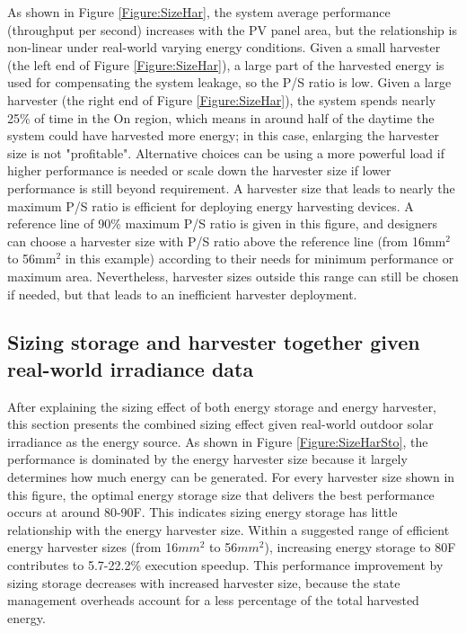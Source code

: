 As shown in Figure \ref{Figure:SizeHar}, the system average performance (throughput per second) increases with the PV panel area, but the relationship is non-linear under real-world varying energy conditions. Given a small harvester (the left end of Figure \ref{Figure:SizeHar}), a large part of the harvested energy is used for compensating the system leakage, so the P/S ratio is low. Given a large harvester (the right end of Figure \ref{Figure:SizeHar}), the system spends nearly 25\% of time in the On region, which means in around half of the daytime the system could have harvested more energy; in this case, enlarging the harvester size is not "profitable". Alternative choices can be using a more powerful load if higher performance is needed or scale down the harvester size if lower performance is still beyond requirement. A harvester size that leads to nearly the maximum P/S ratio is efficient for deploying energy harvesting devices. A reference line of 90\% maximum P/S ratio is given in this figure, and designers can choose a harvester size with P/S ratio above the reference line (from 16mm$^2$ to 56mm$^2$ in this example) according to their needs for minimum performance or maximum area. Nevertheless, harvester sizes outside this range can still be chosen if needed, but that leads to an inefficient harvester deployment. 

\subsection{Sizing storage and harvester together given real-world irradiance data} \label{Section:4.5}

After explaining the sizing effect of both energy storage and energy harvester, this section presents the combined sizing effect given real-world outdoor solar irradiance as the energy source. As shown in Figure \ref{Figure:SizeHarSto}, the performance is dominated by the energy harvester size because it largely determines how much energy can be generated. For every harvester size shown in this figure, the optimal energy storage size that delivers the best performance occurs at around 80-90\textmu F. This indicates sizing energy storage has little relationship with the energy harvester size. Within a suggested range of efficient energy harvester sizes (from 16$mm^2$ to 56$mm^2$), increasing energy storage to 80\textmu F contributes to 5.7-22.2\% execution speedup. This performance improvement by sizing storage decreases with increased harvester size, because the state management overheads account for a less percentage of the total harvested energy. 

